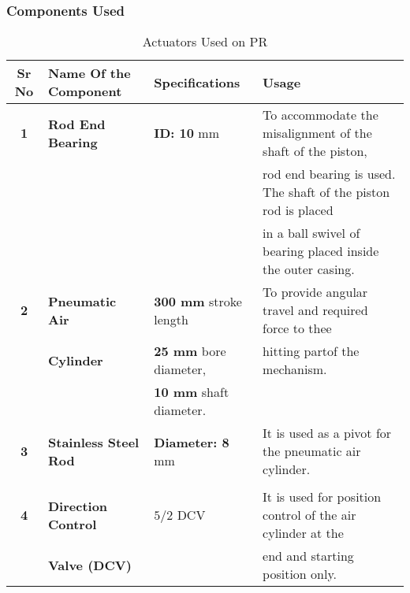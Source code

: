         \subsubsection{Components Used}
        \begin{table}[h]
            \caption {Actuators Used on PR} \label{Actuators_PR}  \small
            \begin{tabular}{|c|l|l|l|}
                \hline  \hline
                \textbf{Sr No}  & \textbf{Name Of the Component}& \textbf{Specifications}               & \textbf{Usage}                                                   \\ \hline    \hline
                \textbf{1}      & \textbf{Rod End Bearing}      & \textbf{ID: 10 }mm                    & To accommodate the misalignment of the shaft of the piston,      \\
                                &                               &                                       & rod end bearing is used. The shaft of the piston rod is placed   \\ 
                                &                               &                                       & in a ball swivel of bearing placed inside the outer casing.      \\ \hline
                \textbf{2}      & \textbf{Pneumatic Air}        & \textbf{300 mm} stroke length         & To provide angular travel and required force to thee             \\
                                & \textbf{Cylinder}             & \textbf{25 mm} bore diameter,         & hitting partof the mechanism.                                    \\  
                                &                               & \textbf{10 mm} shaft diameter.        &                                                                  \\ \hline
                \textbf{3}      & \textbf{Stainless Steel Rod}  & \textbf{Diameter: 8} mm               & It is used as a pivot for the pneumatic air cylinder.            \\
                                &                               &                                       &                                                                  \\ \hline 
                \textbf{4}      & \textbf{Direction Control}    & \textbf{$5/2$} DCV                    & It is used for position control of the air cylinder at the       \\
                                & \textbf{Valve (DCV)}          &                                       & end and starting position only.                                  \\ \hline    \hline   
            \end{tabular}
        \end{table}

